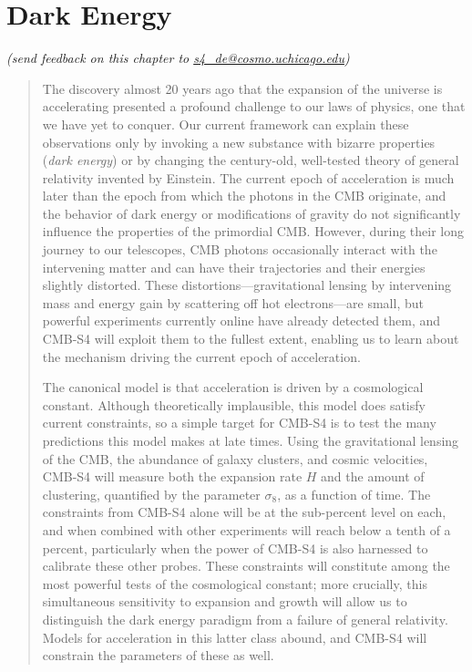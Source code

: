 
\chapter{Dark Energy}

\begin{center}
{\small \it (send feedback on this chapter to \href{mailto:s4_de@cosmo.uchicago.edu}{s4\_de@cosmo.uchicago.edu})}
\end{center}

\begin{quotation}

The discovery almost 20 years ago that the expansion of the universe is accelerating presented a profound challenge to our laws of physics, one that we have yet to conquer. Our current framework can explain these observations only by invoking a new substance with bizarre properties ({\it dark energy}) or by changing the century-old, well-tested theory of general relativity invented by Einstein. The current epoch of acceleration is much later than the epoch from which the photons in the CMB originate, and the behavior of dark energy or modifications of gravity do not significantly influence the properties of the primordial CMB. However, during their long journey to our telescopes, CMB photons occasionally interact with the intervening matter and can have their trajectories and their energies slightly distorted. These distortions---gravitational lensing by intervening mass and energy gain by scattering off hot electrons---are small, but powerful experiments currently online have already detected them, and CMB-S4 will exploit them to the fullest extent, enabling us to learn about the mechanism driving the current epoch of acceleration.

The canonical model is that acceleration is driven by a cosmological constant. Although theoretically implausible, this model does satisfy current constraints, so a simple target for CMB-S4 is to test the many predictions this model makes at late times. Using the gravitational lensing of the CMB, the abundance of galaxy clusters, and cosmic velocities, CMB-S4 will measure both the expansion rate $H$ and the amount of clustering, quantified by the parameter $\sigma_8$, as a function of time. The constraints from CMB-S4 alone will be at the sub-percent level on each, and when combined with other experiments will reach below a tenth of a percent, particularly when the power of CMB-S4 is also harnessed to calibrate these other probes. These constraints will constitute among the most powerful tests of the cosmological constant; more crucially, this simultaneous sensitivity to expansion and growth will allow us to distinguish the dark energy paradigm from a failure of general relativity. Models for acceleration in this latter class abound, and CMB-S4 will constrain the parameters of these as well. 

\end{quotation}

